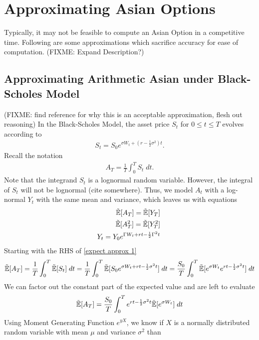 \documentclass[reqno]{amsart}
\newcommand{\rE}[1]{\tilde{\E}[#1]}
\begin{document}
\section{Approximating Asian Options}
Typically, it may not be feasible to compute an Asian Option in a competitive time.
Following are some approximations which sacrifice accuracy for ease of computation.
(FIXME: Expand Description?)

\subsection{Approximating Arithmetic Asian under Black-Scholes Model}
(FIXME: find reference for why this is an acceptable approximation, flesh out reasoning)
In the Black-Scholes Model, the asset price $S_t$ for $0\leq t \leq T$ evolves according to
\begin{align} 
     S_t = S_0e^{\sigma W_t+(r - \frac{1}{2} \sigma^2)t}.
\end{align}
Recall the notation
\begin{align}
     A_T = \frac{1}{T}\int_0^T S_t \; dt.
\end{align}
Note that the integrand $S_t$ is a lognormal random variable.
However, the integral of $S_t$ will not be lognormal (cite somewhere).
Thus, we model $A_t$ with a log-normal $Y_t$ with the same mean and variance, which leaves us with equations
\begin{align} \label{expect approx 1}
     \tilde{\mathbb{E}}[A_T] = \tilde{\mathbb{E}}[Y_T] \; \\
     \label{expect approx 2}
     \tilde{\mathbb{E}}[A_T^2] = \tilde{\mathbb{E}}[Y_T^2] \; \\
     Y_t = Y_0e^{\Gamma W_t+rt-\frac{1}{2}\Gamma^2t} \;
\end{align}
Starting with the RHS of \eqref{expect approx 1}
\begin{align} 
     \rE{A_T} 
     = \frac{1}{T} \int_0^T \tilde{\E}[S_t] \; dt 
     = \frac{1}{T} \int_0^T \tilde{\E}[S_0 e^{\sigma W_t+rt-\frac{1}{2}\sigma^2t}] \; dt
     = \frac{S_0}{T} \int_0^T\rE{e^{\sigma W_t}e^{rt-\frac{1}{2}\sigma^2t}} \; dt
\end{align}
We can factor out the constant part of the expected value and are left to evaluate
\begin{align} \label{simplified expected A_T}
     \rE{A_T} = \frac{S_0}{T} \int_0^T e^{rt-\frac{1}{2}\sigma^2t} \rE{e^{\sigma W_t}}  \; dt
\end{align}
Using Moment Generating Function $e^{yX}$, we know if $X$ is a normally distributed random variable with mean $\mu$ and variance $\sigma^2$ than
\end{document}
